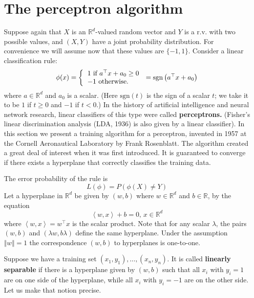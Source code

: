 \documentclass[11pt,twoside]{article}%
\theoremstyle{change}
\begin{document}
\section{The perceptron algorithm}

Suppose again that $X$ is an $\mathbb{R}^{d}$-valued random vector and $Y$ is
a r.v. with two possible values, and $\left(  X,Y\right)  $ have a joint
probability distribution. For convenience we will assume now that these values
are $\{-1,1\}$. Consider a linear classification rule:
\[
\phi(x)=\left\{
\begin{tabular}
[c]{l}%
$1$ if $a^{\top}x+a_{0}\geq0$\\
$-1$ otherwise$.$%
\end{tabular}
\right.  =\mathrm{sgn}\left(  a^{\top}x+a_{0}\right)
\]
where $a\in\mathbb{R}^{d}$ and $a_{0}$ is a scalar. (Here $\mathrm{sgn}\left(
t\right)  $ is the sign of a scalar $t$; we take it to be $1$ if $t\geq0$ and
$-1$ if $t<0$.) In the history of artificial intelligence and neural network
research, linear classifiers of this type were called \textbf{perceptrons.}
(Fisher's linear discrimination analysis (LDA, 1936) is also given by a linear
classifier). In this section we present a training algorithm for a perceptron,
invented in 1957 at the Cornell Aeronautical Laboratory by Frank Rosenblatt.
The algorithm created a great deal of interest when it was first introduced.
It is guaranteed to converge if there exists a hyperplane that correctly
classifies the training data.

The error probability of the rule is
\[
L\left(  \phi\right)  =P\left(  \phi(X)\neq Y\right)
\]
Let a hyperplane in $\mathbb{R}^{d}$ be given by $\left(  w,b\right)  $ where
$w\in\mathbb{R}^{d}$ and $b\in\mathbb{R}$, by the equation
\begin{equation}
\left\langle w,x\right\rangle +b=0\text{, }x\in\mathbb{R}^{d}%
\label{hyperplane-descr}%
\end{equation}
where $\left\langle w,x\right\rangle =w^{\top}x$ is the scalar product. Note
that for any scalar $\lambda$, the pairs $\left(  w,b\right)  $ and $\left(
\lambda w,b\lambda\right)  $ define the same hyperplane. Under the assumption
$\left\Vert w\right\Vert =1$ the correspondence $\left(  w,b\right)  $ to
hyperplanes is one-to-one.

Suppose we have a training set $\left(  x_{1},y_{1}\right)  ,\ldots,\left(
x_{n},y_{n}\right)  $. It is called \textbf{linearly separable} if there is a
hyperplane given by $\left(  w,b\right)  $ such that all $x_{i}$ with
$y_{i}=1$ are on one side of the hyperplane, while all $x_{i}$ with $y_{i}=-1$
are on the other side. Let us make that notion precise.
\end{document}
